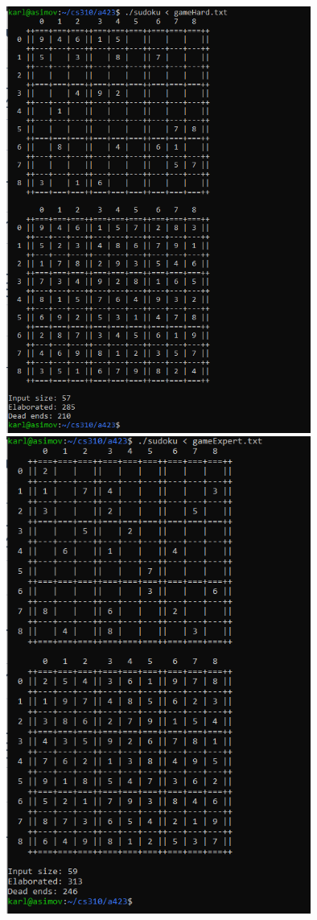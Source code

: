 \documentclass[11pt]{article}
\begin{document}
\begin{center}
    \includegraphics[width=0.75\textwidth]{hard.png}
    \includegraphics[width=0.75\textwidth]{expert.png}
\end{center}
\end{document}

